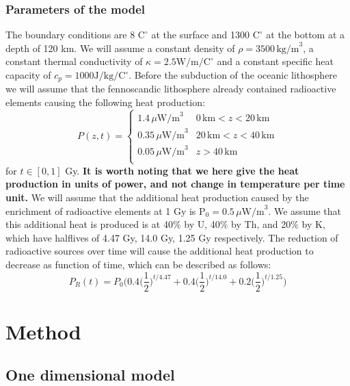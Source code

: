 \documentclass{article}
\begin{document}
\begin{multicols}{2}
\subsubsection{Parameters of the model}
The boundary conditions are 8 $\text{C}^{\circ}$ at the surface and 1300 $\text{C}^{\circ}$ at the bottom at a depth of 120 km. We will assume a constant density of $\rho=3500 \, \text{kg/m}^3$, a constant thermal conductivity of $\kappa=2.5 \text{W/m/} \text{C}^{\circ}$ and a constant specific heat capacity of $c_p=1000 \text{J/kg/}\text{C}^{\circ}$. Before the subduction of the oceanic lithosphere we will assume that the fennoscandic lithosphere already contained radioactive elements causing the following heat production:
\[
P(z, t) =
\begin{cases}
1.4 \, \mu \text{W/m}^3 &  0 \, \text{km} < z < 20 \, \text{km} \\
0.35 \, \mu \text{W/m}^3 &  20 \, \text{km} < z < 40 \, \text{km} \\
0.05 \, \mu \text{W/m}^3 &  z > 40 \, \text{km} \\
\end{cases}
\]
for $t\in [0, 1]$ Gy. \textbf{It is worth noting that we here give the heat production in units of power, and not change in temperature per time unit.} We will assume that the additional heat production caused by the enrichment of radioactive elements at 1 Gy is $\text{P}_0=0.5 \, \mu \text{W/m}^3$. We assume that this additional heat is produced is at 40$\%$ by U, 40$\%$ by Th, and 20$\%$ by K, which have halflives of 4.47 Gy, 14.0 Gy, 1.25 Gy respectively. The reduction of radioactive sources over time will cause the additional heat production to decrease as function of time, which can be described as follows:
\begin{equation}
	P_R(t) = P_0\Bigg(0.4\bigg(\frac{1}{2}\bigg)^{t/4.47}+0.4\bigg(\frac{1}{2}\bigg)^{t/14.0}+0.2\bigg(\frac{1}{2}\bigg)^{t/1.25}\Bigg)
\end{equation}


\section{Method}

\subsection{One dimensional model}


\end{multicols}
\end{document}
